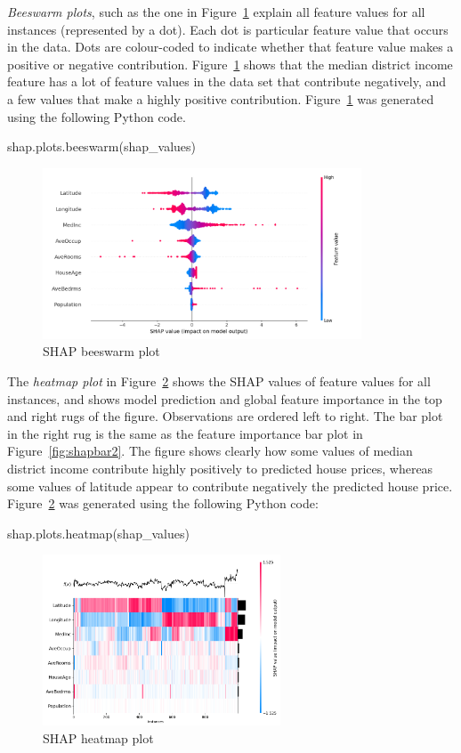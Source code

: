 \emph{Beeswarm plots}, such as the one in Figure~\ref{fig:shapbeeswarm} explain all feature values for all instances (represented by a dot). Each dot is particular feature value that occurs in the data. Dots are colour-coded to indicate whether that feature value makes a positive or negative contribution. Figure~\ref{fig:shapbeeswarm} shows that the median district income feature has a lot of feature values in the data set that contribute negatively, and a few values that make a highly positive contribution. Figure~\ref{fig:shapbeeswarm} was generated using the following Python code.

\begin{pythoncode}
shap.plots.beeswarm(shap_values)
\end{pythoncode}

\begin{figure}
\centering

\includegraphics[height=2in]{shap_beeswarm1.png}
\caption{SHAP beeswarm plot}
\label{fig:shapbeeswarm}
\end{figure}


The \emph{heatmap plot} in Figure~\ref{fig:shapheatmap} shows the SHAP values of feature values for all instances, and shows model prediction and global feature importance in the top and right rugs of the figure. Observations are ordered left to right. The bar plot in the right rug is the same as the feature importance bar plot in Figure~\ref{fig:shapbar2}. The figure shows clearly how some values of median district income contribute highly positively to predicted house prices, whereas some values of latitude appear to contribute negatively the predicted house price. Figure~\ref{fig:shapheatmap} was generated using the following Python code:

\begin{pythoncode}
shap.plots.heatmap(shap_values)
\end{pythoncode}

\begin{figure}
\centering

\includegraphics[height=2in]{shap_heatmap1.png}
\caption{SHAP heatmap plot}
\label{fig:shapheatmap}
\end{figure}

